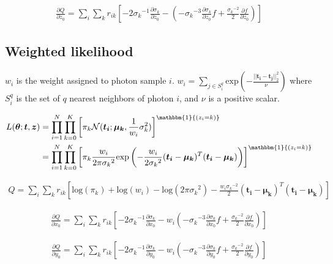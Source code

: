 \documentclass{article}
\begin{document}
\begin{align} \label{eqn:dz_no_weight}
\frac{\partial Q}{\partial z_0} = \sum_i \sum_k r_{ik} \left[ -2{\sigma_k}^{-1}\frac{\partial \sigma_k}{\partial z_0} - \left( -{\sigma_k}^{-3} \frac{\partial \sigma_k}{\partial z_0}f + \frac{{\sigma_k}^{-2}}{2} \frac{\partial f}{\partial z_0}  \right) \right] 
\end{align}



\subsection{Weighted likelihood} \label{sec:weighted_like}

$w_i$ is the weight assigned to photon sample $i$.
$w_i = \sum\limits_{j \in S_i^q} \text{exp} \left( -\frac{||\bm{t_i}-\bm{t_j}||_2^2}{\nu} \right)$
where $S_i^q$ is the set of $q$ nearest neighbors of photon $i$, and $\nu$ is a 
positive scalar.



\begin{align}
L(\bm{\theta};\bm{t},\bm{z}) &= \prod_{i=1}^N \prod_{k=0}^K \left[ \pi_k \mathcal{N}(\bm{t_i};\bm{\mu_k},\frac{1}{w_i}\sigma_k^2) \right]^{\mathbbm{1}{(z_i=k)}} \\
&= \prod_{i=1}^N \prod_{k=0}^K \left[ \pi_k \frac{w_i}{2\pi{\sigma_k}^2} \text{exp}\left( -\frac{w_i}{2{\sigma_k}^2} (\bm{t_i}-\bm{\mu_k})^T(\bm{t_i}-\bm{\mu_k}) \right) \right]^{\mathbbm{1}{(z_i=k)}}
\end{align}

\begin{align}
Q = \sum_i \sum_k r_{ik} \left[ \text{log}(\pi_k) + \text{log}(w_i) - \text{log}(2\pi{\sigma_k}^2) - \frac{w_i{\sigma_k}^{-2}}{2}(\bm{t_i}-\bm{\mu_k})^T(\bm{t_i}-\bm{\mu_k}) \right]
\end{align}

\begin{align}
\frac{\partial Q}{\partial x_0} = \sum_i \sum_k r_{ik} \left[ -2{\sigma_k}^{-1}\frac{\partial \sigma_k}{\partial x_0} - w_i\left( -{\sigma_k}^{-3} \frac{\partial \sigma_k}{\partial x_0}f + \frac{{\sigma_k}^{-2}}{2} \frac{\partial f}{\partial x_0}  \right) \right] 
\end{align}

\begin{align}
\frac{\partial Q}{\partial y_0} = \sum_i \sum_k r_{ik} \left[ -2{\sigma_k}^{-1}\frac{\partial \sigma_k}{\partial y_0} - w_i\left( -{\sigma_k}^{-3} \frac{\partial \sigma_k}{\partial y_0}f + \frac{{\sigma_k}^{-2}}{2} \frac{\partial f}{\partial y_0}  \right) \right] 
\end{align}
\end{document}
